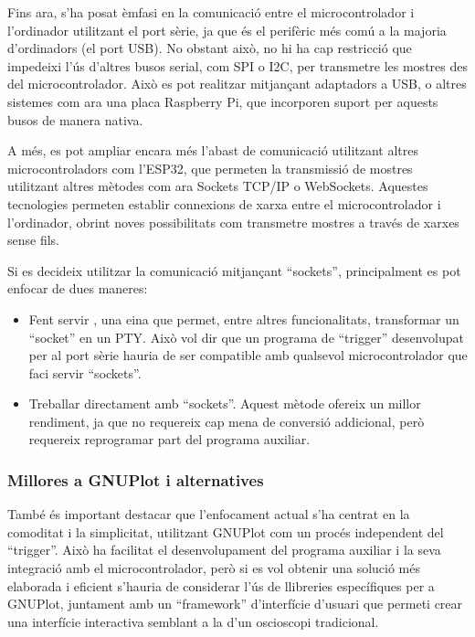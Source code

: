 \documentclass{tfgitic}[2023/06/30]
\begin{document}
Fins ara, s'ha posat èmfasi en la comunicació entre el
microcontrolador i l'ordinador utilitzant el port sèrie, ja que és el
perifèric més comú a la majoria d'ordinadors (el port USB). No obstant
això, no hi ha cap restricció que impedeixi l'ús d'altres busos
serial, com SPI o I2C, per transmetre les mostres des del
microcontrolador. Això es pot realitzar mitjançant adaptadors a USB, o
altres sistemes com ara una placa Raspberry Pi, que incorporen suport
per aquests busos de manera nativa.

A més, es pot ampliar encara més l'abast de comunicació utilitzant
altres microcontroladors com l'ESP32, que permeten la transmissió de
mostres utilitzant altres mètodes com ara Sockets TCP/IP o
WebSockets. Aquestes tecnologies permeten establir connexions de xarxa
entre el microcontrolador i l'ordinador, obrint noves possibilitats
com transmetre mostres a través de xarxes sense fils.

Si es decideix utilitzar la comunicació mitjançant ``sockets'',
principalment es pot enfocar de dues maneres:

\begin{itemize}
	\item Fent servir \cite[socat]{socat}, una eina que permet,
          entre altres funcionalitats, transformar un ``socket'' en un
          PTY. Això vol dir que un programa de ``trigger''
          desenvolupat per al port sèrie hauria de ser compatible amb
          qualsevol microcontrolador que faci servir ``sockets''.
	\item Treballar directament amb ``sockets''. Aquest mètode
          ofereix un millor rendiment, ja que no requereix cap mena de
          conversió addicional, però requereix reprogramar part del
          programa auxiliar.
\end{itemize}

\newpage

\subsubsection{Millores a GNUPlot i alternatives}

També és important destacar que l'enfocament actual s'ha centrat en la
comoditat i la simplicitat, utilitzant GNUPlot com un procés
independent del ``trigger''. Això ha facilitat el desenvolupament del
programa auxiliar i la seva integració amb el microcontrolador, però
si es vol obtenir una solució més elaborada i eficient s'hauria de
considerar l'ús de llibreries específiques per a GNUPlot, juntament
amb un ``framework'' d'interfície d'usuari que permeti crear una
interfície interactiva semblant a la d'un osci\lgem oscopi
tradicional.
\end{document}
